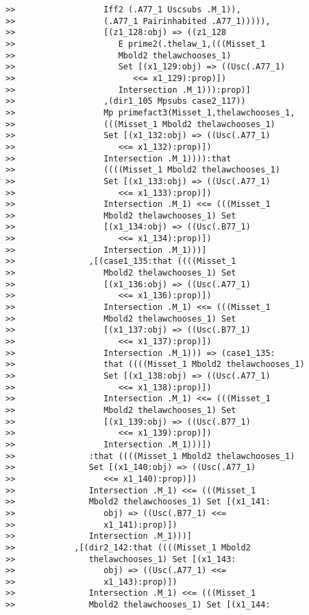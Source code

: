 \documentclass[12pt]{article}
\begin{document}
\begin{verbatim}
>>                  Iff2 (.A77_1 Uscsubs .M_1)),
>>                  (.A77_1 Pairinhabited .A77_1))))),
>>                  [(z1_128:obj) => ((z1_128
>>                     E prime2(.thelaw_1,(((Misset_1
>>                     Mbold2 thelawchooses_1)
>>                     Set [(x1_129:obj) => ((Usc(.A77_1)
>>                        <<= x1_129):prop)])
>>                     Intersection .M_1))):prop)]
>>                  ,(dir1_105 Mpsubs case2_117))
>>                  Mp primefact3(Misset_1,thelawchooses_1,
>>                  (((Misset_1 Mbold2 thelawchooses_1)
>>                  Set [(x1_132:obj) => ((Usc(.A77_1)
>>                     <<= x1_132):prop)])
>>                  Intersection .M_1)))):that
>>                  ((((Misset_1 Mbold2 thelawchooses_1)
>>                  Set [(x1_133:obj) => ((Usc(.A77_1)
>>                     <<= x1_133):prop)])
>>                  Intersection .M_1) <<= (((Misset_1
>>                  Mbold2 thelawchooses_1) Set
>>                  [(x1_134:obj) => ((Usc(.B77_1)
>>                     <<= x1_134):prop)])
>>                  Intersection .M_1)))]
>>               ,[(case1_135:that ((((Misset_1
>>                  Mbold2 thelawchooses_1) Set
>>                  [(x1_136:obj) => ((Usc(.A77_1)
>>                     <<= x1_136):prop)])
>>                  Intersection .M_1) <<= (((Misset_1
>>                  Mbold2 thelawchooses_1) Set
>>                  [(x1_137:obj) => ((Usc(.B77_1)
>>                     <<= x1_137):prop)])
>>                  Intersection .M_1))) => (case1_135:
>>                  that ((((Misset_1 Mbold2 thelawchooses_1)
>>                  Set [(x1_138:obj) => ((Usc(.A77_1)
>>                     <<= x1_138):prop)])
>>                  Intersection .M_1) <<= (((Misset_1
>>                  Mbold2 thelawchooses_1) Set
>>                  [(x1_139:obj) => ((Usc(.B77_1)
>>                     <<= x1_139):prop)])
>>                  Intersection .M_1)))])
>>               :that ((((Misset_1 Mbold2 thelawchooses_1)
>>               Set [(x1_140:obj) => ((Usc(.A77_1)
>>                  <<= x1_140):prop)])
>>               Intersection .M_1) <<= (((Misset_1
>>               Mbold2 thelawchooses_1) Set [(x1_141:
>>                  obj) => ((Usc(.B77_1) <<=
>>                  x1_141):prop)])
>>               Intersection .M_1)))]
>>            ,[(dir2_142:that ((((Misset_1 Mbold2
>>               thelawchooses_1) Set [(x1_143:
>>                  obj) => ((Usc(.A77_1) <<=
>>                  x1_143):prop)])
>>               Intersection .M_1) <<= (((Misset_1
>>               Mbold2 thelawchooses_1) Set [(x1_144:

\end{verbatim}
\end{document}

